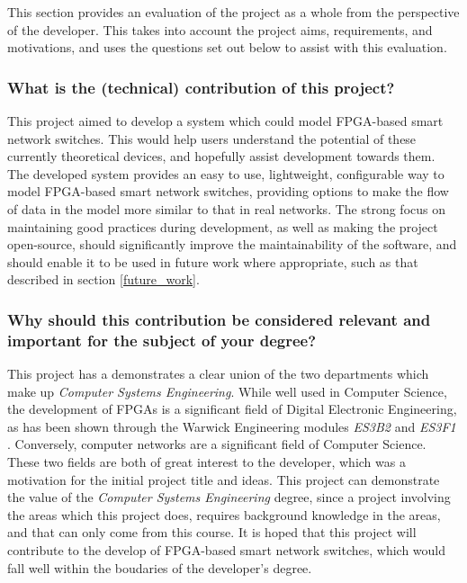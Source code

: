 This section provides an evaluation of the project as a whole from the perspective of the developer. This takes into account the project aims, requirements, and motivations, and uses the questions set out below to assist with this evaluation.


\subsubsection{What is the (technical) contribution of this project?}
This project aimed to develop a system which could model FPGA-based smart network switches. This would help users understand the potential of these currently theoretical devices, and hopefully assist development towards them.
The developed system provides an easy to use, lightweight, configurable way to model FPGA-based smart network switches, providing options to make the flow of data in the model more similar to that in real networks.
The strong focus on maintaining good practices during development, as well as making the project open-source, should significantly improve the maintainability of the software, and should enable it to be used in future work where appropriate, such as that described in section \ref{future_work}.

\subsubsection{Why should this contribution be considered relevant and important for the subject of your degree?}
This project has a demonstrates a clear union of the two departments which make up \textit{Computer Systems Engineering}.
While well used in Computer Science, the development of FPGAs is a significant field of Digital Electronic Engineering, as has been shown through the Warwick Engineering modules \textit{ES3B2} \cite{es3b2} and \textit{ES3F1} \cite{es3f1}.
Conversely, computer networks are a significant field of Computer Science.
These two fields are both of great interest to the developer, which was a motivation for the initial project title and ideas.
This project can demonstrate the value of the \textit{Computer Systems Engineering} degree, since a project involving the areas which this project does, requires background knowledge in the areas, and that can only come from this course.
It is hoped that this project will contribute to the develop of FPGA-based smart network switches, which would fall well within the boudaries of the developer's degree.

